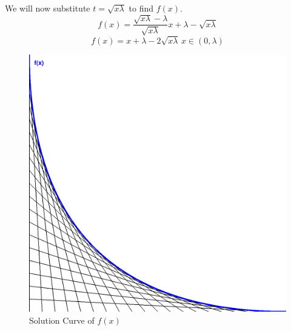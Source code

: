 \documentclass[12pt]{article}
\renewcommand\l[0]{\lambda}
\begin{document}
We will now substitute $t=\sqrt{x \l}$ to find $f(x)$.
$$f(x) = \dfrac{\sqrt{x\l}-\l}{\sqrt{x\l}}x + \l - \sqrt{x\l}$$
$$\boxed{f(x) = x+\l -2\sqrt{x\l}} \, x\in (0, \l)$$

\begin{figure}[htp]
    \centering
    \includegraphics[width=10 cm]{f(x).png}
    \caption{Solution Curve of $f(x)$}
\end{figure}

\vspace{5 cm}
\end{document}
